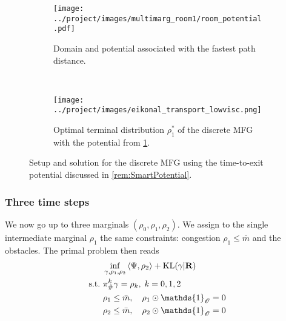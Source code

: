 \documentclass[../report.tex]{subfiles}
\begin{document}
\begin{figure}[h]
	\centering
	\begin{subfigure}[b]{.4\linewidth}
		\centering
		\texttt{[image: ../project/images/multimarg\_room1/room\_potential.pdf]}
		\caption{Domain and potential associated with the fastest path distance.}\label{fig:CrowdShortedPathPotential}
	\end{subfigure}~
	\begin{subfigure}[b]{.36\linewidth}
		\centering
		\texttt{[image: ../project/images/eikonal\_transport\_lowvisc.png]}
		\caption{Optimal terminal distribution $\rho^*_1$ of the discrete MFG with the potential from \cref{fig:CrowdShortedPathPotential}.}\label{fig:2MargEikonalGame}
	\end{subfigure}
	\caption{Setup and solution for the discrete MFG using the time-to-exit potential discussed in \cref{rem:SmartPotential}.}
\end{figure}


\subsubsection{Three time steps}

We now go up to three marginals $(\rho_0,\rho_1,\rho_2)$. We assign to the single intermediate marginal $\rho_1$ the same constraints: congestion $\rho_1 \leq \bar{m}$ and the obstacles. The primal problem then reads
\begin{equation}
\begin{aligned}
	&\inf_{\gamma,\rho_1,\rho_2}{} \langle \Psi, \rho_2\rangle + \KL(\gamma | \bfR) \\
	\suchthat \ & \pi^k_\#\gamma = \rho_k,\; k = 0,1,2 \\
	& \rho_1 \leq \bar{m}, \quad \rho_1\odot\mathds{1}_{\mathscr O} = 0\\
	& \rho_2 \leq \bar{m}, \quad \rho_2\odot\mathds{1}_{\mathscr O} = 0
\end{aligned}
\end{equation}
\end{document}
